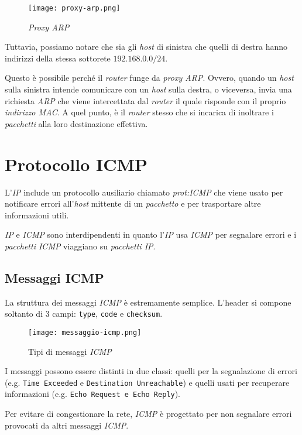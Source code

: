 \begin{figure}[h!]
    \centering
    \texttt{[image: proxy-arp.png]}
    \caption{\emph{Proxy ARP}}
\end{figure}\noindent
Tuttavia, possiamo notare che sia gli \emph{host} di sinistra che quelli
di destra hanno indirizzi della stessa sottorete $192.168.0.0/24$.

Questo è possibile perché il \emph{router} funge da \emph{proxy ARP}. Ovvero,
quando un \emph{host} sulla sinistra intende comunicare con un \emph{host}
sulla destra, o viceversa, invia una richiesta \emph{ARP} che viene intercettata
dal \emph{router} il quale risponde con il proprio \emph{indirizzo MAC}. A quel
punto, è il \emph{router} stesso che si incarica di inoltrare i \emph{pacchetti}
alla loro destinazione effettiva.

\section{Protocollo ICMP}
L'\emph{IP} include un protocollo ausiliario chiamato \emph{\gls{prot:ICMP}} che
viene usato per notificare errori all'\emph{host} mittente di un \emph{pacchetto}
e per trasportare altre informazioni utili.

\emph{IP} e \emph{ICMP} sono interdipendenti in quanto l'\emph{IP} usa \emph{ICMP}
per segnalare errori e i \emph{pacchetti ICMP} viaggiano su \emph{pacchetti IP}.

\subsection{Messaggi ICMP}
La struttura dei messaggi \emph{ICMP} è estremamente semplice. L'header si compone
soltanto di 3 campi: \texttt{type}, \texttt{code} e \texttt{checksum}.
\begin{figure}[ht]
    \centering
    \texttt{[image: messaggio-icmp.png]}
    \caption{Tipi di messaggi \emph{ICMP}}
\end{figure}

I messaggi possono essere distinti in due classi: quelli per la segnalazione
di errori (e.g. \texttt{Time Exceeded} e \texttt{Destination Unreachable}) e
quelli usati per recuperare informazioni (e.g. \texttt{Echo Request e Echo Reply}).

\begin{note}
    Per evitare di congestionare la rete, \emph{ICMP} è progettato per non
    segnalare errori provocati da altri messaggi \emph{ICMP}.
\end{note}

